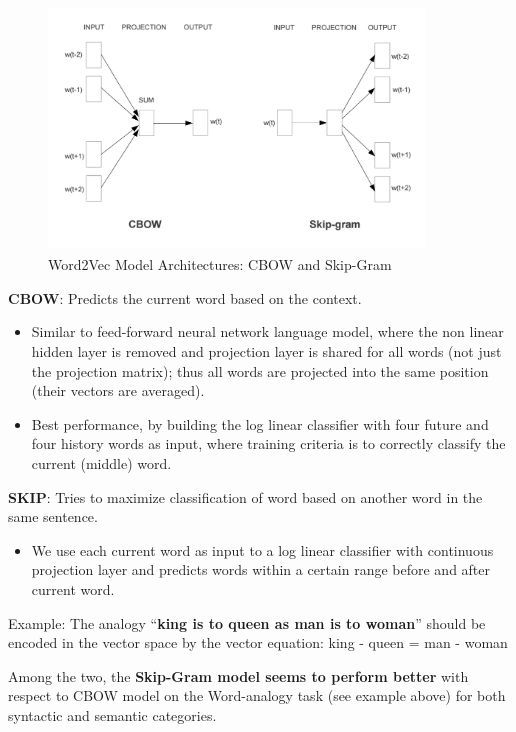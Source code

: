 \begin{figure}[ht!]
	\centering
		\includegraphics[height=65mm,  width=100mm]{figures/4_w2v.png}
		\caption[Word2Vec Model Architectures]{Word2Vec Model Architectures: CBOW and Skip-Gram}
			\label{w2vmodelarch}
\end{figure}

\textbf{CBOW}: Predicts the current word based on the context.
\begin{itemize}
\item Similar to feed-forward neural network language model, where the non linear hidden layer is removed and projection layer is shared for all words (not just the projection matrix); thus all words are projected into the same position (their vectors are averaged).
\item Best performance, by building the log linear classifier with four future and four history words as input, where training criteria is to correctly classify the current (middle) word.
\end{itemize}
\textbf{SKIP}: Tries to maximize classification of word based on another word in the same sentence.
\begin{itemize}
\item We use each current word as input to a log linear classifier with continuous projection layer and predicts words within a certain range before and after current word.
\end{itemize}

Example: The analogy “\textbf{king is to queen as man is to woman}” should be encoded in the vector space by the vector equation: king - queen = man - woman
\newline

Among the two, the \textbf{Skip-Gram model seems to perform better} with respect to CBOW model on the Word-analogy task (see example above) for both syntactic and semantic categories.

